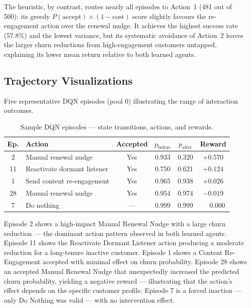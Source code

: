 \documentclass{article}
\begin{document}
The heuristic, by contrast, routes nearly all episodes to Action~1 (481 out of 500): its
greedy $P(\text{accept}) \times (1 - \text{cost})$ score slightly favours the re-engagement
action over the renewal nudge. It achieves the highest success rate (57.8\%) and the lowest
variance, but its systematic avoidance of Action~2 leaves the larger churn reductions from
high-engagement customers untapped, explaining its lower mean return relative to both learned
agents.

\subsection{Trajectory Visualizations}

Five representative DQN episodes (pool 0) illustrating the range of interaction outcomes.

\begin{table}[H]
\centering
\caption{Sample DQN episodes — state transitions, actions, and rewards.}
\label{tab:trajectories}
\begin{tabular}{clcccc}
\toprule
\textbf{Ep.} & \textbf{Action} & \textbf{Accepted} & \textbf{$p_{\text{before}}$} & \textbf{$p_{\text{after}}$} & \textbf{Reward} \\
\midrule
2  & Manual renewal nudge          & Yes & 0.933 & 0.320 & $+0.570$ \\
11 & Reactivate dormant listener   & Yes & 0.750 & 0.621 & $+0.124$ \\
1  & Send content re-engagement    & Yes & 0.965 & 0.938 & $+0.026$ \\
28 & Manual renewal nudge          & Yes & 0.954 & 0.974 & $-0.019$ \\
7  & Do nothing                    & --- & 0.999 & 0.999 & $\phantom{+}0.000$ \\
\bottomrule
\end{tabular}
\end{table}

Episode 2 shows a high-impact Manual Renewal Nudge with a large churn reduction — the
dominant action pattern observed in both learned agents. Episode 11 shows the Reactivate
Dormant Listener action producing a moderate reduction for a long-tenure inactive customer.
Episode 1 shows a Content Re-Engagement accepted with minimal effect on churn probability.
Episode 28 shows an accepted Manual Renewal Nudge that unexpectedly increased the predicted
churn probability, yielding a negative reward — illustrating that the action's effect depends
on the specific customer profile. Episode 7 is a forced inaction — only Do Nothing was valid
— with no intervention effect.
\end{document}
